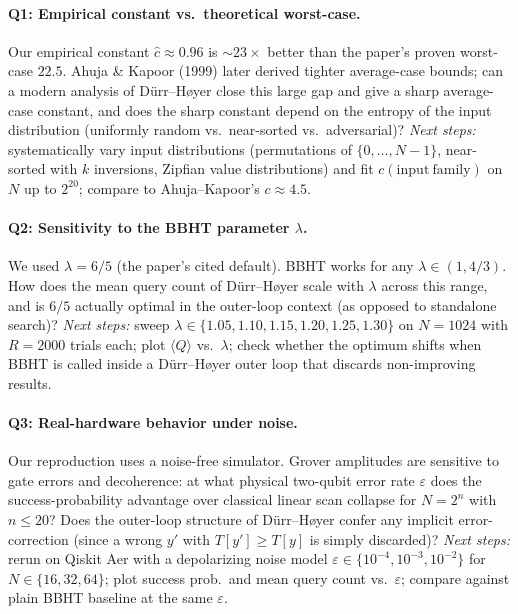 \documentclass[11pt]{article}
\begin{document}
\paragraph{Q1: Empirical constant vs.\ theoretical worst-case.}
Our empirical constant $\hat c\approx 0.96$ is $\sim 23\times$ better than
the paper's proven worst-case $22.5$. Ahuja \& Kapoor (1999) later derived
tighter average-case bounds; can a modern analysis of Dürr--Høyer close
this large gap and give a sharp average-case constant, and does the sharp
constant depend on the entropy of the input distribution (uniformly
random vs.\ near-sorted vs.\ adversarial)?
\emph{Next steps:} systematically vary input distributions (permutations
of $\{0,\dots,N-1\}$, near-sorted with $k$ inversions, Zipfian value
distributions) and fit $c(\mathrm{input\ family})$ on $N$ up to $2^{20}$;
compare to Ahuja--Kapoor's $c\approx 4.5$.

\paragraph{Q2: Sensitivity to the BBHT parameter $\lambda$.}
We used $\lambda=6/5$ (the paper's cited default). BBHT works for any
$\lambda\in(1,4/3)$. How does the mean query count of Dürr--Høyer scale
with $\lambda$ across this range, and is $6/5$ actually optimal in the
outer-loop context (as opposed to standalone search)?
\emph{Next steps:} sweep $\lambda\in\{1.05,1.10,1.15,1.20,1.25,1.30\}$
on $N=1024$ with $R=2000$ trials each; plot $\langle Q\rangle$ vs.\
$\lambda$; check whether the optimum shifts when BBHT is called inside
a Dürr--Høyer outer loop that discards non-improving results.

\paragraph{Q3: Real-hardware behavior under noise.}
Our reproduction uses a noise-free simulator. Grover amplitudes are
sensitive to gate errors and decoherence: at what physical two-qubit
error rate $\varepsilon$ does the success-probability advantage over
classical linear scan collapse for $N=2^n$ with $n\le 20$? Does the
outer-loop structure of Dürr--Høyer confer any implicit error-correction
(since a wrong $y'$ with $T[y']\ge T[y]$ is simply discarded)?
\emph{Next steps:} rerun on Qiskit Aer with a depolarizing noise model
$\varepsilon\in\{10^{-4},10^{-3},10^{-2}\}$ for $N\in\{16,32,64\}$; plot
success prob.\ and mean query count vs.\ $\varepsilon$; compare against
plain BBHT baseline at the same $\varepsilon$.
\end{document}
